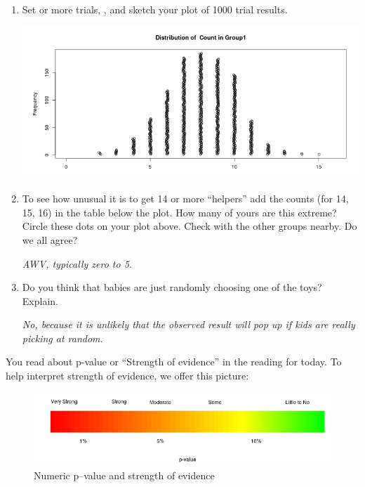 \begin{enumerate}
\begin{key}
{\it 12 in my first, 8 in my second }
\end{key}

    \item  Set   or more trials,  , and   
              sketch your plot of 1000 trial results. 
\begin{students}
  \vspace{4cm}
\end{students}

\begin{key}
    \includegraphics[width=.8\linewidth]{../plots/Helper16.png}
\end{key}
\item To see how unusual it is to get 14 or more ``helpers'' add the
  counts (for 14, 15, 16) in the table below the plot.
   How many of yours are this extreme? Circle
  these dots on your plot above. Check with the other groups
  nearby. Do we all agree?
\begin{students}
  \vspace{1.5cm}
\end{students}

\begin{key}
{\it  AWV, typically zero to 5.
}
\end{key}
\item  Do you think that babies are just randomly choosing one of
      the toys? Explain.
\begin{students}
  \vspace{1.5cm}
\end{students}

\begin{key}
  {\it No, because it is unlikely that the observed result will pop up
    if  kids are really picking at random. }
\end{key}

  \end{enumerate}
  You read about p-value or ``Strength of evidence'' in the reading
  for today.   To help interpret strength of evidence, we offer this picture:
 \begin{figure}[h]
   \centering
\includegraphics[width=\linewidth]{../plots/pvalueStrengths.png}
   \caption{Numeric p--value and strength of evidence}
   \label{fig:SOE-pvalue}
 \end{figure}

